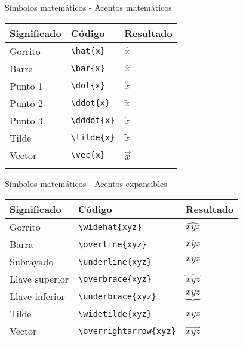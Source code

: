 \documentclass[
  ignorenonframetext,
]{beamer}
\begin{document}
\begin{frame}[fragile]{Símbolos matemáticos - Acentos matemáticos}
\protect\hypertarget{suxedmbolos-matemuxe1ticos---acentos-matemuxe1ticos}{}
\begin{longtable}[]{@{}lll@{}}
\toprule\noalign{}
Significado & Código & Resultado \\
\midrule\noalign{}
\endhead
Gorrito & \texttt{\textbackslash{}hat\{x\}} & \(\hat{x}\) \\
Barra & \texttt{\textbackslash{}bar\{x\}} & \(\bar{x}\) \\
Punto 1 & \texttt{\textbackslash{}dot\{x\}} & \(\dot{x}\) \\
Punto 2 & \texttt{\textbackslash{}ddot\{x\}} & \(\ddot{x}\) \\
Punto 3 & \texttt{\textbackslash{}dddot\{x\}} & \(\dddot{x}\) \\
Tilde & \texttt{\textbackslash{}tilde\{x\}} & \(\tilde{x}\) \\
Vector & \texttt{\textbackslash{}vec\{x\}} & \(\vec{x}\) \\
\bottomrule\noalign{}
\end{longtable}
\end{frame}

\begin{frame}[fragile]{Símbolos matemáticos - Acentos expansibles}
\protect\hypertarget{suxedmbolos-matemuxe1ticos---acentos-expansibles}{}
\begin{longtable}[]{@{}lll@{}}
\toprule\noalign{}
Significado & Código & Resultado \\
\midrule\noalign{}
\endhead
Gorrito & \texttt{\textbackslash{}widehat\{xyz\}} & \(\widehat{xyz}\) \\
Barra & \texttt{\textbackslash{}overline\{xyz\}} & \(\overline{xyz}\) \\
Subrayado & \texttt{\textbackslash{}underline\{xyz\}} &
\(\underline{xyz}\) \\
Llave superior & \texttt{\textbackslash{}overbrace\{xyz\}} &
\(\overbrace{xyz}\) \\
Llave inferior & \texttt{\textbackslash{}underbrace\{xyz\}} &
\(\underbrace{xyz}\) \\
Tilde & \texttt{\textbackslash{}widetilde\{xyz\}} &
\(\widetilde{xyz}\) \\
Vector & \texttt{\textbackslash{}overrightarrow\{xyz\}} &
\(\overrightarrow{xyz}\) \\
\bottomrule\noalign{}
\end{longtable}
\end{frame}
\end{document}
